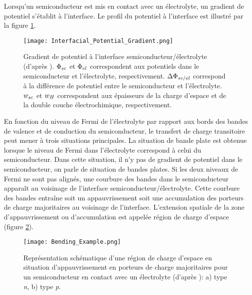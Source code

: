 \begin{refsection}
    Lorsqu'un semiconducteur est mis en contact avec un électrolyte, un gradient de potentiel s'établit à l'interface. Le
    profil du potentiel à l'interface est illustré par la figure \ref{fig:interfacial_potential_gradient}. 
    
    \begin{figure}[H]
        \centering
        \texttt{[image: Interfacial\_Potential\_Gradient.png]}
        \caption[Gradient de potentiel à l'interface semiconducteur/électrolyte.]
        {Gradient de potentiel à l'interface semiconducteur/électrolyte (d'après \citet{Marcus2006}). $\Phi _{sc}$ et
        $\Phi _{el}$
        correspondent aux potentiels dans le semiconducteur et l'électrolyte, respectivement. $\Delta \Phi _{sc/el}$ correspond à la
        différence de potentiel entre le semiconducteur et l'électrolyte. $w_{sc}$ et $w_{H}$ correspondent aux
        épaisseurs de la charge d'espace et de la double couche électrochimique, respectivement.}
        \label{fig:interfacial_potential_gradient}
    \end{figure}
    
    En fonction du niveau de Fermi de
    l'électrolyte par rapport aux bords des bandes de valence et de conduction du semiconducteur, le transfert de charge
    transitoire peut mener à trois situations principales. La situation de bande plate est obtenue lorsque le niveau de Fermi
    dans l'électrolyte correspond à celui du semiconducteur. Dans cette situation, il n'y pas de
    gradient de potentiel dans le semiconducteur, on parle de situation de bandes plates. Si les deux niveaux de Fermi
    ne sont pas alignés, une courbure des bandes
    dans le semiconducteur apparaît au voisinage de l'interface semiconducteur/électrolyte. 
    Cette courbure des bandes entraîne soit un appauvrissement soit
    une accumulation des porteurs de charge majoritaires au voisinage de l'interface.
    L'extension spatiale de la zone d'appauvrissement
    ou d'accumulation est appelée région de charge d'espace (figure \ref{fig:bending_example}).

     \begin{figure}[H]
        \centering
        \texttt{[image: Bending\_Example.png]}
        \caption[Représentation schématique d'une région de charge d'espace en situation d'appauvrissement en porteurs 
        de charge majoritaires pour un semiconducteur en contact avec un électrolyte: a)
        type \emph{n}, b) type \emph{p}.]
        {Représentation schématique d'une région de charge d'espace en situation d'appauvrissement en porteurs 
            de charge majoritaires pour un semiconducteur en contact avec un électrolyte (d'après \citet{Bard2002, Memming2008}): a)
        type \emph{n}, b) type \emph{p}.}
        \label{fig:bending_example}
    \end{figure}


\end{refsection}
